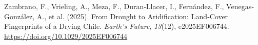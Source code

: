 \documentclass[
]{agujournal2019}
\newlength{\cslhangindent}
\newenvironment{CSLReferences}[2] %
 {\begin{list}{}{%
  \setlength{\itemindent}{0pt}
  \setlength{\leftmargin}{0pt}
  \setlength{\parsep}{0pt}
  \ifodd #1
   \setlength{\leftmargin}{\cslhangindent}
   \setlength{\itemindent}{-1\cslhangindent}
  \fi
  \setlength{\itemsep}{#2\baselineskip}}}
 {\end{list}}
\begin{document}
\begin{CSLReferences}{1}{0}
Zambrano, F., Vrieling, A., Meza, F., Duran‐Llacer, I., Fernández, F.,
Venegas‐González, A., et al. (2025). From {Drought} to {Aridification}:
{Land}‐{Cover} {Fingerprints} of a {Drying} {Chile}. \emph{Earth's
Future}, \emph{13}(12), e2025EF006744.
\url{https://doi.org/10.1029/2025EF006744}

\end{CSLReferences}
\end{document}
